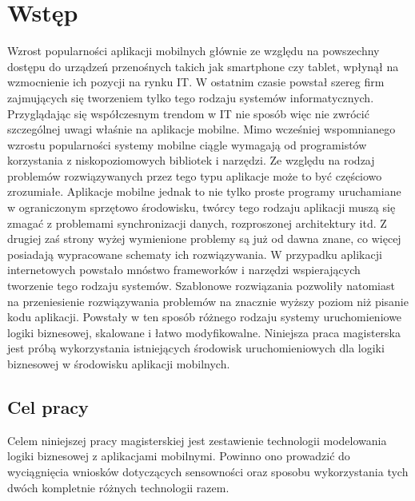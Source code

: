 \chapter{Wstęp}
\label{cha:wstep}

Wzrost popularności aplikacji mobilnych głównie ze względu na powszechny dostępu do urządzeń przenośnych takich jak smartphone czy tablet, wpłynął na wzmocnienie ich pozycji na rynku IT. W ostatnim czasie powstał szereg firm zajmujących się tworzeniem tylko tego rodzaju systemów informatycznych. Przyglądając się współczesnym trendom w IT nie sposób więc nie zwrócić szczególnej uwagi  właśnie na aplikacje mobilne. Mimo wcześniej wspomnianego wzrostu popularności systemy mobilne ciągle wymagają od programistów korzystania z niskopoziomowych bibliotek i narzędzi. Ze względu na rodzaj problemów rozwiązywanych przez tego typu aplikacje może to być częściowo zrozumiałe. Aplikacje mobilne jednak to nie tylko proste programy uruchamiane w ograniczonym sprzętowo środowisku, twórcy tego rodzaju aplikacji muszą się zmagać z problemami synchronizacji danych, rozproszonej architektury  itd. 
Z drugiej zaś strony wyżej wymienione problemy są już od dawna znane, co więcej posiadają wypracowane schematy ich rozwiązywania. W przypadku aplikacji internetowych powstało mnóstwo frameworków i narzędzi wspierających tworzenie tego rodzaju systemów. Szablonowe rozwiązania pozwoliły natomiast na przeniesienie rozwiązywania problemów na znacznie wyższy poziom niż pisanie kodu aplikacji. Powstały w ten sposób różnego rodzaju systemy uruchomieniowe logiki biznesowej, skalowane i łatwo modyfikowalne. 
Niniejsza praca magisterska jest próbą wykorzystania istniejących środowisk uruchomieniowych dla logiki biznesowej w środowisku aplikacji mobilnych. 


\section{Cel pracy}
\label{sec:celePracy}

Celem niniejszej pracy magisterskiej jest zestawienie technologii  modelowania logiki biznesowej z aplikacjami mobilnymi. Powinno ono prowadzić do wyciągnięcia wniosków dotyczących sensowności oraz sposobu wykorzystania tych dwóch kompletnie różnych technologii razem. 


